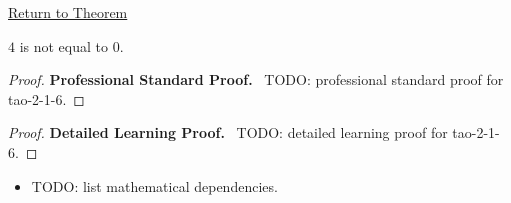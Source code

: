 \newpage
{}
\label{prf:tao-2-1-6}

\begin{remark*}[Return]
\hyperref[prop:tao-2-1-6]{Return to Theorem}
\end{remark*}

\begin{theorem*}
$4$ is not equal to $0$.
\end{theorem*}

\begin{proof}
\textbf{Professional Standard Proof.}~
TODO: professional standard proof for tao-2-1-6.
\end{proof}

\begin{proof}
\textbf{Detailed Learning Proof.}~
TODO: detailed learning proof for tao-2-1-6.
\end{proof}

\begin{remark*}
\end{remark*}

\begin{dependencies}
\begin{itemize}
  \item TODO: list mathematical dependencies.
\end{itemize}
\end{dependencies}

\clearpage
